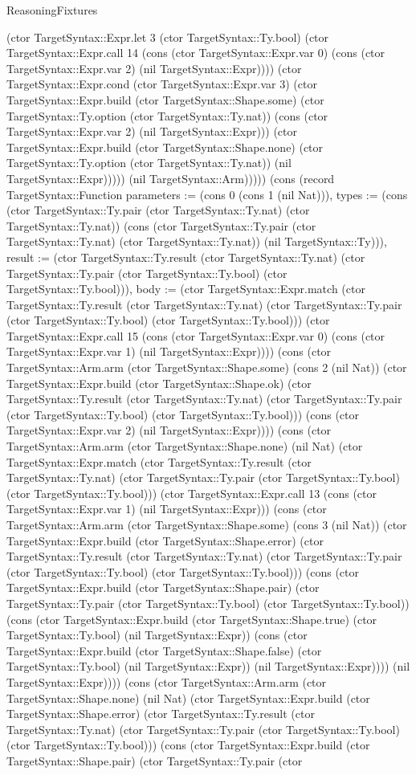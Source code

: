 \begin{lexlean}{ReasoningFixtures}
\begin{semanticmodule}
{(ctor TargetSyntax::Expr.let 3 (ctor TargetSyntax::Ty.bool) (ctor TargetSyntax::Expr.call 14 (cons (ctor TargetSyntax::Expr.var 0) (cons (ctor TargetSyntax::Expr.var 2) (nil TargetSyntax::Expr)))) (ctor TargetSyntax::Expr.cond (ctor TargetSyntax::Expr.var 3) (ctor TargetSyntax::Expr.build (ctor TargetSyntax::Shape.some) (ctor TargetSyntax::Ty.option (ctor TargetSyntax::Ty.nat)) (cons (ctor TargetSyntax::Expr.var 2) (nil TargetSyntax::Expr))) (ctor TargetSyntax::Expr.build (ctor TargetSyntax::Shape.none) (ctor TargetSyntax::Ty.option (ctor TargetSyntax::Ty.nat)) (nil TargetSyntax::Expr))))) (nil TargetSyntax::Arm))))}) (cons (record TargetSyntax::Function {parameters := (cons 0 (cons 1 (nil Nat))), types := (cons (ctor TargetSyntax::Ty.pair (ctor TargetSyntax::Ty.nat) (ctor TargetSyntax::Ty.nat)) (cons (ctor TargetSyntax::Ty.pair (ctor TargetSyntax::Ty.nat) (ctor TargetSyntax::Ty.nat)) (nil TargetSyntax::Ty))), result := (ctor TargetSyntax::Ty.result (ctor TargetSyntax::Ty.nat) (ctor TargetSyntax::Ty.pair (ctor TargetSyntax::Ty.bool) (ctor TargetSyntax::Ty.bool))), body := (ctor TargetSyntax::Expr.match (ctor TargetSyntax::Ty.result (ctor TargetSyntax::Ty.nat) (ctor TargetSyntax::Ty.pair (ctor TargetSyntax::Ty.bool) (ctor TargetSyntax::Ty.bool))) (ctor TargetSyntax::Expr.call 15 (cons (ctor TargetSyntax::Expr.var 0) (cons (ctor TargetSyntax::Expr.var 1) (nil TargetSyntax::Expr)))) (cons (ctor TargetSyntax::Arm.arm (ctor TargetSyntax::Shape.some) (cons 2 (nil Nat)) (ctor TargetSyntax::Expr.build (ctor TargetSyntax::Shape.ok) (ctor TargetSyntax::Ty.result (ctor TargetSyntax::Ty.nat) (ctor TargetSyntax::Ty.pair (ctor TargetSyntax::Ty.bool) (ctor TargetSyntax::Ty.bool))) (cons (ctor TargetSyntax::Expr.var 2) (nil TargetSyntax::Expr)))) (cons (ctor TargetSyntax::Arm.arm (ctor TargetSyntax::Shape.none) (nil Nat) (ctor TargetSyntax::Expr.match (ctor TargetSyntax::Ty.result (ctor TargetSyntax::Ty.nat) (ctor TargetSyntax::Ty.pair (ctor TargetSyntax::Ty.bool) (ctor TargetSyntax::Ty.bool))) (ctor TargetSyntax::Expr.call 13 (cons (ctor TargetSyntax::Expr.var 1) (nil TargetSyntax::Expr))) (cons (ctor TargetSyntax::Arm.arm (ctor TargetSyntax::Shape.some) (cons 3 (nil Nat)) (ctor TargetSyntax::Expr.build (ctor TargetSyntax::Shape.error) (ctor TargetSyntax::Ty.result (ctor TargetSyntax::Ty.nat) (ctor TargetSyntax::Ty.pair (ctor TargetSyntax::Ty.bool) (ctor TargetSyntax::Ty.bool))) (cons (ctor TargetSyntax::Expr.build (ctor TargetSyntax::Shape.pair) (ctor TargetSyntax::Ty.pair (ctor TargetSyntax::Ty.bool) (ctor TargetSyntax::Ty.bool)) (cons (ctor TargetSyntax::Expr.build (ctor TargetSyntax::Shape.true) (ctor TargetSyntax::Ty.bool) (nil TargetSyntax::Expr)) (cons (ctor TargetSyntax::Expr.build (ctor TargetSyntax::Shape.false) (ctor TargetSyntax::Ty.bool) (nil TargetSyntax::Expr)) (nil TargetSyntax::Expr)))) (nil TargetSyntax::Expr)))) (cons (ctor TargetSyntax::Arm.arm (ctor TargetSyntax::Shape.none) (nil Nat) (ctor TargetSyntax::Expr.build (ctor TargetSyntax::Shape.error) (ctor TargetSyntax::Ty.result (ctor TargetSyntax::Ty.nat) (ctor TargetSyntax::Ty.pair (ctor TargetSyntax::Ty.bool) (ctor TargetSyntax::Ty.bool))) (cons (ctor TargetSyntax::Expr.build (ctor TargetSyntax::Shape.pair) (ctor TargetSyntax::Ty.pair (ctor }
\end{semanticmodule}
\end{lexlean}
